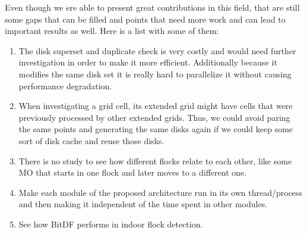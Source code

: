 Even though we ere able to present great contributions in this field, that are still some gaps that can be filled and
points that need more work and can lead to important results as well. Here is a list with some of them:

\begin{enumerate}
    \item The disk superset and duplicate check is very costly and would need further investigation in order to make it
        more efficient. Additionally because it modifies the same disk set it is really hard to parallelize it without
        causing performance degradation.
    \item When investigating a grid cell, its extended grid might have cells that were previously processed by other
        extended grids. Thus, we could avoid paring the same points and generating the same disks again if we could keep
        some sort of disk cache and reuse those disks.
    \item There is no study to see how different flocks relate to each other, like some MO that starts in one flock and
        later moves to a different one.
    \item Make each module of the proposed architecture run in its own thread/process and then making it independent of
        the time spent in other modules.
    \item See how BitDF performs in indoor flock detection.
\end{enumerate}
%
%
%
%
